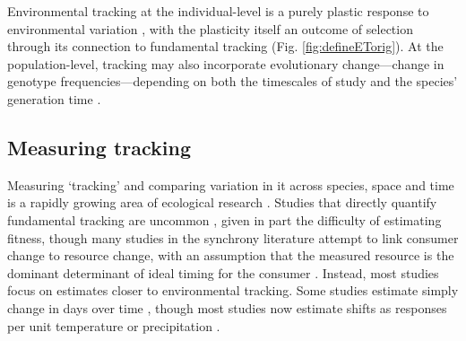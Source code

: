 \documentclass[11pt,letterpaper]{article}
\begin{document}
Environmental tracking at the individual-level is a purely plastic response to environmental variation \citep[in line with current findings on most climate change responses,][]{bonamour2019}, with the plasticity itself an outcome of selection \citep{chevin2010} through its connection to fundamental tracking (Fig. \ref{fig:defineETorig}). At the population-level, tracking may also incorporate evolutionary change---change in genotype frequencies---depending on both the timescales of study and the species' generation time \citep[this evolutionary response can be predicted as the difference between the environmental sensitivity of phenotypic selection and an organism's plasticity, $|B-b|$ in][]{chevin2010}. 
\fi

\subsection{Measuring tracking}
Measuring `tracking' and comparing variation in it across species, space and time is a rapidly growing area of ecological research \citep[e.g.,][]{Cook:2012pnas,fu2015,thackeray2016,cohen2018}. Studies that directly quantify fundamental tracking are uncommon \citep[but see][]{visser2006,charm2008}, given in part the difficulty of estimating fitness, though many studies in the synchrony literature attempt to link consumer change to resource change, with an assumption that the measured resource is the dominant determinant of ideal timing for the consumer \citep[though this may rarely be true, see][]{Singer:2010eb,Johansson2012,reed2013}. Instead, most studies focus on estimates closer to environmental tracking. Some studies estimate simply change in days over time \citep[e.g.,][]{Parmesan:2007tv,kharouba2018}, though most studies now estimate shifts as responses per unit temperature \citep[for example, multiple meta-analyses show plants' spring phenology shifts with spring or annual temperatures 4-6 days/$\degree$C on average across species,][]{Richardson:2006qh,Wolkovich:2012n,thackeray2016} or precipitation \citep{inouye2002,Craine:2012kl}. %
\end{document}
